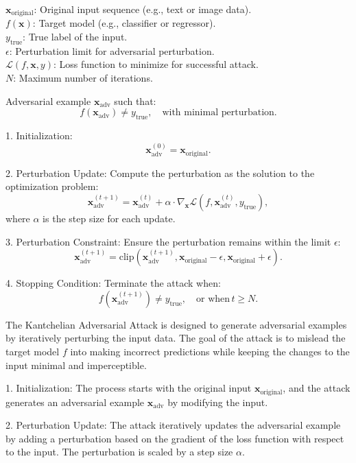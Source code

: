 
$\mathbf{x}_{\text{original}}$: Original input sequence (e.g., text or image data). \\
$f(\mathbf{x})$: Target model (e.g., classifier or regressor). \\
$y_{\text{true}}$: True label of the input. \\
$\epsilon$: Perturbation limit for adversarial perturbation. \\
$\mathcal{L}(f, \mathbf{x}, y)$: Loss function to minimize for successful attack. \\
$N$: Maximum number of iterations.

Adversarial example $\mathbf{x}_{\text{adv}}$ such that:
\[
f(\mathbf{x}_{\text{adv}}) \neq y_{\text{true}}, \quad \text{with minimal perturbation}.
\]

1. Initialization:
   \[
   \mathbf{x}_{\text{adv}}^{(0)} = \mathbf{x}_{\text{original}}.
   \]

2. Perturbation Update:
   Compute the perturbation as the solution to the optimization problem:
   \[
   \mathbf{x}_{\text{adv}}^{(t+1)} = \mathbf{x}_{\text{adv}}^{(t)} + \alpha \cdot \nabla_{\mathbf{x}} \mathcal{L}(f, \mathbf{x}_{\text{adv}}^{(t)}, y_{\text{true}}),
   \]
   where $\alpha$ is the step size for each update.

3. Perturbation Constraint:
   Ensure the perturbation remains within the limit $\epsilon$:
   \[
   \mathbf{x}_{\text{adv}}^{(t+1)} = \text{clip}(\mathbf{x}_{\text{adv}}^{(t+1)}, \mathbf{x}_{\text{original}} - \epsilon, \mathbf{x}_{\text{original}} + \epsilon).
   \]

4. Stopping Condition:
   Terminate the attack when:
   \[
   f(\mathbf{x}_{\text{adv}}^{(t+1)}) \neq y_{\text{true}}, \quad \text{or when} \, t \geq N.
   \]

The Kantchelian Adversarial Attack is designed to generate adversarial examples by iteratively perturbing the input data. The goal of the attack is to mislead the target model $f$ into making incorrect predictions while keeping the changes to the input minimal and imperceptible.

1. Initialization: The process starts with the original input $\mathbf{x}_{\text{original}}$, and the attack generates an adversarial example $\mathbf{x}_{\text{adv}}$ by modifying the input.

2. Perturbation Update: The attack iteratively updates the adversarial example by adding a perturbation based on the gradient of the loss function with respect to the input. The perturbation is scaled by a step size $\alpha$.

